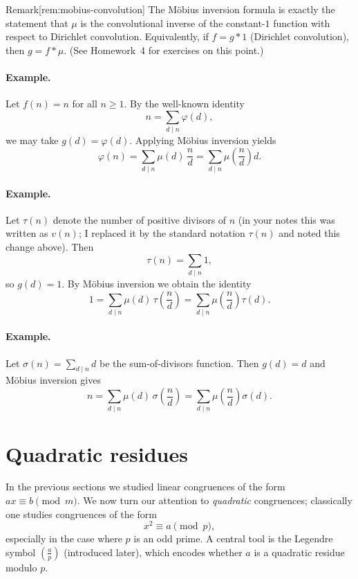 \documentclass[10pt]{article}
\theoremstyle{definition}
\theoremstyle{plain}
\numberwithin{equation}{section}
\begin{document}
\begin{define}{Remark}[rem:mobius-convolution]
The Möbius inversion formula is exactly the statement that $\mu$ is the
convolutional inverse of the constant-$1$ function with respect to Dirichlet
convolution. Equivalently, if $f=g*1$ (Dirichlet convolution), then $g=f*\mu$.
(See Homework~4 for exercises on this point.)
\end{define}


\paragraph{Example.}
Let $f(n)=n$ for all $n\ge 1$. By the well-known identity
\[
n=\sum_{d\mid n}\varphi(d),
\]
we may take $g(d)=\varphi(d)$. Applying Möbius inversion yields
\[
\varphi(n)=\sum_{d\mid n}\mu(d)\,\frac{n}{d}
          =\sum_{d\mid n}\mu\!\left(\frac{n}{d}\right)d.
\]

\paragraph{Example.}
Let $\tau(n)$ denote the number of positive divisors of $n$ (in your notes
this was written as $v(n)$; I replaced it by the standard notation $\tau(n)$
and noted this change above). Then
\[
\tau(n)=\sum_{d\mid n} 1,
\]
so $g(d)=1$. By Möbius inversion we obtain the identity
\[
1=\sum_{d\mid n}\mu(d)\,\tau\!\left(\frac{n}{d}\right)
 =\sum_{d\mid n}\mu\!\left(\frac{n}{d}\right)\tau(d).
\]

\paragraph{Example.}
Let $\sigma(n)=\sum_{d\mid n} d$ be the sum-of-divisors function. Then
$g(d)=d$ and Möbius inversion gives
\[
n=\sum_{d\mid n}\mu(d)\,\sigma\!\left(\frac{n}{d}\right)
 =\sum_{d\mid n}\mu\!\left(\frac{n}{d}\right)\sigma(d).
\]


\section*{Quadratic residues}
In the previous sections we studied linear congruences of the form
$ax\equiv b\pmod m$. We now turn our attention to \emph{quadratic}
congruences; classically one studies congruences of the form
\[
x^2 \equiv a \pmod p,
\]
especially in the case where $p$ is an odd prime. A central tool is the
Legendre symbol $(\tfrac{a}{p})$ (introduced later), which encodes whether
$a$ is a quadratic residue modulo $p$.
\end{document}
